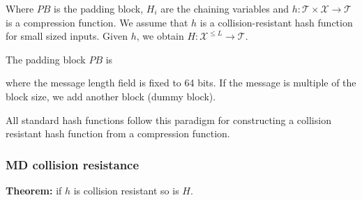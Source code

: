 \documentclass[12pt]{book}
\newcommand{\Thm}{\textbf{Theorem:} }
\begin{document}
\begin{center}
\end{center}Where $PB$ is the padding block, $H_{i}$ are the chaining variables and $h:\mathcal{T}\times\mathcal{X}\rightarrow\mathcal{T}$ is a compression function. We assume that $h$ is a collision-resistant hash function for small sized inputs. Given $h$, we obtain $H:\mathcal{X}^{\leq L}\rightarrow\mathcal{T}$.

The padding block $PB$ is  where the message length field is fixed to 64 bits. If the message is multiple of the block size, we add another block (dummy block).

All standard hash functions follow this paradigm for constructing a collision resistant hash function from a compression function.

\subsubsection{MD collision resistance}
\Thm if $h$ is collision resistant so is $H$.
\end{document}
